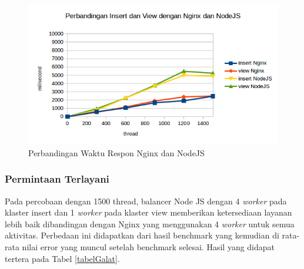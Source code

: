 \documentclass{ta-its}
\begin{document}
					\begin{figure}[h] 
						\centering
						\includegraphics[width=\linewidth]{contoh_img/hasil-perbandingan}
						\caption{Perbandingan Waktu Respon Nginx dan NodeJS}
						\label{gambarPerbandingan}
					\end{figure}
					
				\subsubsection{Permintaan Terlayani}
					Pada percobaan dengan 1500 thread, balancer Node JS dengan 4 \textit{worker} pada klaster insert dan 1 \textit{worker} pada klaster view memberikan ketersediaan layanan lebih baik dibandingan dengan Nginx yang menggunakan 4 \textit{worker} untuk semua aktivitas. Perbedaan ini didapatkan dari hasil benchmark yang kemudian di rata-rata nilai error yang muncul setelah benchmark selesai. Hasil yang didapat
					tertera pada Tabel \ref{tabelGalat}.
					
\end{document}
